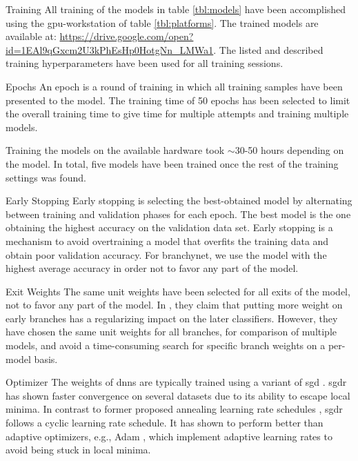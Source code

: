 \begin{enumdescript}
	\item[Training] All training of the models in table \ref{tbl:models} have been accomplished using the \gls{gpu}-workstation of table \ref{tbl:platforms}. The trained models are available at: {\color{sns-grey}\url{https://drive.google.com/open?id=1EAl9qGxcm2U3kPhEsHp0HotgNn_LMWa1}}.
	The listed and described training hyperparameters have been used for all training sessions. 
	
	\begin{enumdescript}
		\item[Epochs] An epoch is a round of training in which all training samples have been presented to the model. The training time of 50 epochs has been selected to limit the overall training time to give time for multiple attempts and training multiple models.
		
		Training the models on the available hardware took $\sim$30-50 hours depending on the model. In total, five models have been trained once the rest of the training settings was found.
		
		\item[Early Stopping] Early stopping is selecting the best-obtained model by alternating between training and validation phases for each epoch. The best model is the one obtaining the highest accuracy on the validation data set. Early stopping is a mechanism to avoid overtraining a model that overfits the training data and obtain poor validation accuracy. For \gls{branchynet}, we use the model with the highest average accuracy in order not to favor any part of the model.  
		
		\item[Exit Weights] The same unit weights have been selected for all exits of the model, not to favor any part of the model. In \cite{teerapittayanon_branchynet:_2016}, they claim that putting more weight on early branches has a regularizing impact on the later classifiers. However, they have chosen the same unit weights for all branches, for comparison of multiple models, and avoid a time-consuming search for specific branch weights on a per-model basis.
		
		\item[Optimizer] The weights of \gls{dnn}s are typically trained using a variant of \gls{sgd} \cite{goodfellow_deep_2016}. \gls{sgdr} \cite{loshchilov_sgdr:_2016} has shown faster convergence on several datasets due to its ability to escape local minima. In contrast to former proposed annealing learning rate schedules \cite{}, \gls{sgdr} follows a cyclic learning rate schedule. It has shown to perform better than adaptive optimizers, e.g., Adam \cite{kingma_adam:_2014}, which implement adaptive learning rates to avoid being stuck in local minima. 
		

\end{enumdescript}
\end{enumdescript}
